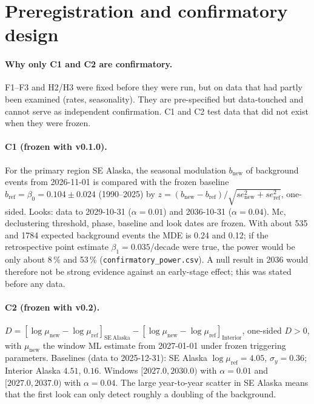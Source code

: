 \documentclass[11pt,a4paper]{article}
\begin{document}
\section{Preregistration and confirmatory design}
\label{sec:prereg}

\paragraph{Why only C1 and C2 are confirmatory.}
F1--F3 and H2/H3 were fixed before they were run, but on data that had partly been examined (rates, seasonality). They are pre-specified but data-touched and cannot serve as independent confirmation. C1 and C2 test data that did not exist when they were frozen.

\paragraph{C1 (frozen with v0.1.0).}
For the primary region SE Alaska, the seasonal modulation $b_\mathrm{new}$ of background events from 2026-11-01 is compared with the frozen baseline $b_\mathrm{ref}=\beta_0=0.104\pm0.024$ (1990--2025) by $z=(b_\mathrm{new}-b_\mathrm{ref})/\sqrt{se_\mathrm{new}^2+se_\mathrm{ref}^2}$, one-sided. Looks: data to 2029-10-31 ($\alpha=0.01$) and 2036-10-31 ($\alpha=0.04$). Mc, declustering threshold, phase, baseline and look dates are frozen. With about 535 and 1784 expected background events the MDE is 0.24 and 0.12; if the retrospective point estimate $\beta_1=0.035$/decade were true, the power would be only about 8\,\% and 53\,\% (\texttt{confirmatory\_power.csv}). A null result in 2036 would therefore not be strong evidence against an early-stage effect; this was stated before any data.

\paragraph{C2 (frozen with v0.2).}
$D=[\log\mu_\mathrm{new}-\log\mu_\mathrm{ref}]_\mathrm{SE\,Alaska}-[\log\mu_\mathrm{new}-\log\mu_\mathrm{ref}]_\mathrm{Interior}$, one-sided $D>0$, with $\mu_\mathrm{new}$ the window ML estimate from 2027-01-01 under frozen triggering parameters. Baselines (data to 2025-12-31): SE Alaska $\log\mu_\mathrm{ref}=4.05$, $\sigma_y=0.36$; Interior Alaska $4.51$, $0.16$. Windows $[2027.0, 2030.0)$ with $\alpha=0.01$ and $[2027.0, 2037.0)$ with $\alpha=0.04$. The large year-to-year scatter in SE Alaska means that the first look can only detect roughly a doubling of the background.
\end{document}
